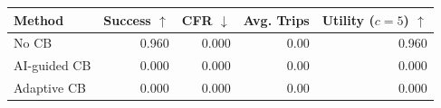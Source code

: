 \begin{tabular}{lrrrr}
\toprule
Method & Success $\uparrow$ & CFR $\downarrow$ & Avg. Trips & Utility ($c=5$) $\uparrow$ \\
\midrule
No CB & 0.960 & 0.000 & 0.00 & 0.960 \\
AI-guided CB & 0.000 & 0.000 & 0.00 & 0.000 \\
Adaptive CB & 0.000 & 0.000 & 0.00 & 0.000 \\
\bottomrule
\end{tabular}
